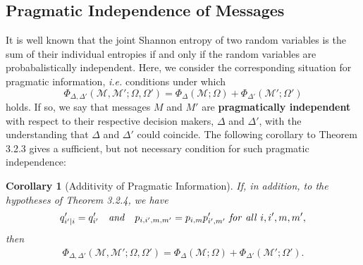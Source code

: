 \documentclass[11pt]{article}
\newtheorem*{corollary}{Corollary}
\begin{document}
\subsection{Pragmatic Independence of Messages}

It is well known that the joint Shannon entropy of two random variables is the sum of their individual entropies if and only if the random variables are probabalistically independent.  Here, we consider the corresponding situation for
pragmatic information, {\it i.e.} conditions under which 
$$
\Phi_{\Delta, \Delta'} (\mathcal M, \mathcal M'; \Omega, \Omega')=\Phi_{\Delta} ({\mathcal M}; \Omega)  +
\Phi_{\Delta'} ({\mathcal M'}; \Omega')   
$$
holds.  If so, we say that messages $M$ and $M'$ are {\bf pragmatically independent} with respect to their respective decision makers, $\Delta$ and $\Delta'$, with the understanding
that $\Delta$ and $\Delta'$ could coincide.  The following corollary to Theorem 3.2.3 gives a sufficient, but not necessary condition for such pragmatic independence:

\begin{corollary}[Additivity of Pragmatic Information]
If, in addition, to the hypotheses of  Theorem 3.2.4, we have
\begin{align}
q'_{i'|i} = q'_{i'} {\it \quad and \quad} p_{i, i', m, m'} = p_{i, m} p'_{i', m'}  {\it \ for \ all \ } i, i', m, m', 
\label{eq:PragIndependenceCond}
\end{align}
then 
\begin{align}
 \Phi_{\Delta, \Delta'} (\mathcal M, \mathcal M'; \Omega, \Omega')=\Phi_{\Delta} ({\mathcal M}; \Omega)  +
\Phi_{\Delta'} ({\mathcal M'}; \Omega').   
\label{eq:PragIndependence}
\end{align}
\end{corollary}
\end{document}
